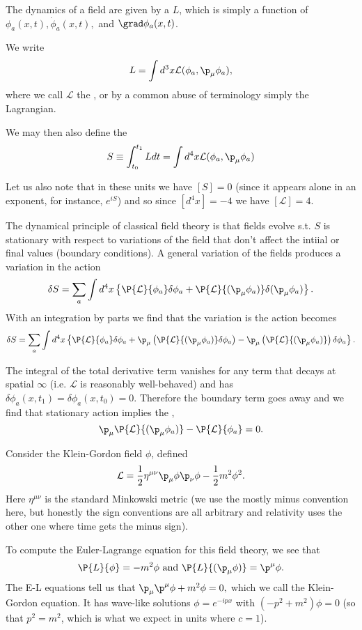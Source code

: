 The dynamics of a field are given by a  $L$, which is simply a function of $\phi_a(x,t), \dot \phi_a(x,t),$ and $\grad \phi_a(x,t)$. 
\begin{defn}
We write
$$L=\int d^3 x \mathcal{L}(\phi_a, \p_\mu \phi_a),$$
where we call $\mathcal{L}$ the , or by a common abuse of terminology simply the Lagrangian.
\end{defn}
\begin{defn}
We may then also define the 
$$S\equiv \int_{t_0}^{t_1}L dt = \int d^4x \mathcal{L}(\phi_a,\p_\mu \phi_a)$$
\end{defn}
Let us also note that in these units we have $[S]=0$ (since it appears alone in an exponent, for instance, $e^{iS}$) and so since $[d^4x]=-4$ we have $[\mathcal{L}]=4.$

The dynamical principle of classical field theory is that fields evolve s.t. $S$ is stationary with respect to variations of the field that don't affect the intiial or final values (boundary conditions). A general variation of the fields produces a variation in the action
$$\delta S=\sum_a \int d^4 x\left \{ \P{\mathcal{L}}{\phi_a}\delta\phi_a +\P{\mathcal{L}}{(\p_\mu\phi_a)} \delta(\p_\mu \phi_a)\right\}.$$
With an integration by parts we find that the variation is the action becomes
$$\delta S= \sum_a \int d^4x \left\{ \P{\mathcal{L}}{\phi_a}\delta \phi_a +\p_\mu \left( \P{\mathcal{L}}{(\p_\mu \phi_a)}\delta \phi_a\right)-\p_\mu \left(\P{\mathcal{L}}{(\p_\mu \phi_a)}\right)\delta \phi_a\right\}.$$

The integral of the total derivative term vanishes for any term that decays at spatial $\infty$ (i.e. $\mathcal{L}$ is reasonably well-behaved) and has $\delta \phi_a(x,t_1)=\delta \phi_a(x,t_0)=0$. Therefore the boundary term goes away and we find that stationary action implies the ,
$$\p_\mu\P{\mathcal{L}}{(\p_\mu\phi_a)}-\P{\mathcal{L}}{\phi_a}=0.$$

\begin{exm}
Consider the Klein-Gordon field $\phi$, defined
$$\mathcal{L}=\frac{1}{2} \eta^{\mu\nu}\p_\mu \phi \p_\nu \phi -\frac{1}{2}m^2 \phi^2.$$
Here $\eta^{\mu\nu}$ is the standard Minkowski metric (we use the mostly minus convention here, but honestly the sign conventions are all arbitrary and relativity uses the other one where time gets the minus sign).

To compute the Euler-Lagrange equation for this field theory, we see that $$\P{L}{\phi}=-m^2\phi \text{ and } \P{L}{(\p_\mu \phi)}=\p^\mu \phi.$$
The E-L equations tell us that $\p_\mu \p^\mu \phi+m^2\phi = 0,$ which we call the Klein-Gordon equation. It has wave-like solutions $\phi=e^{-ipx}$ with $(-p^2+m^2)\phi=0$ (so that $p^2=m^2$, which is what we expect in units where $c=1$).
\end{exm}